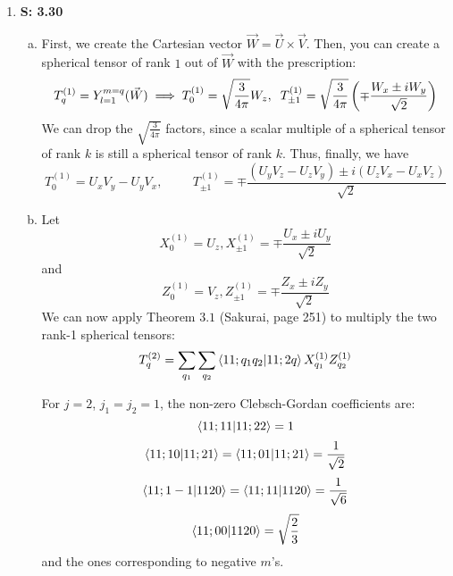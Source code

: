 \documentclass[12pt, letterpaper]{article}
\begin{document}
\begin{enumerate}

    \item[] \textbf{S: 3.30}
    \begin{enumerate}[(a)]
\item First, we create the Cartesian vector $\vec{W}=\vec{U}\times \vec{V}$. Then, you can create a spherical tensor of rank $1$ out of $\vec{W}$ with the prescription:
\begin{equation}
        T^{(1)}_q=Y_{l=1}^{m=q}(\vec{W})\implies T^{(1)}_0=\sqrt{\frac{3}{4\pi}}W_z,\hspace{2mm} T^{(1)}_{\pm 1}=\sqrt{\frac{3}{4\pi}}\left(\mp \frac{W_x\pm iW_y}{\sqrt{2}}\right)
\end{equation}
We can drop the $\sqrt{\frac{3}{4\pi}}$ factors, since a scalar multiple of a spherical tensor of rank $k$ is still a spherical tensor of rank $k$. Thus, finally, we have
\begin{equation}
        T^{(1)}_0=U_xV_y-U_yV_x,\hspace{1cm}T_{\pm 1}^{(1)}=\mp \frac{\left(U_yV_z-U_zV_y\right)\pm i\left(U_zV_x-U_xV_z\right)}{\sqrt{2}}
\end{equation}
\item 
Let 
\begin{equation}
        X^{(1)}_0=U_z,X^{(1)}_{\pm 1}=\mp \frac{U_x\pm iU_y}{\sqrt{2}}
\end{equation}
and 
\begin{equation}
        Z^{(1)}_0=V_z,Z^{(1)}_{\pm 1}=\mp \frac{Z_x\pm iZ_y}{\sqrt{2}}
\end{equation}
We can now apply Theorem $3.1$ (Sakurai, page 251) to multiply the two rank-1 spherical tensors:
\begin{align}
    T^{(2)}_q=\sum_{q_1}\sum_{q_2}\braket{1 1;q_1 q_2|1 1; 2 q}X_{q_1}^{(1)}Z_{q_2}^{(1)}
\end{align}

For $j=2$, $j_1=j_2=1$, the non-zero Clebsch-Gordan coefficients are:
\begin{equation}
        \braket{1 1; 1 1|1 1; 2 2}=1
\end{equation}
\begin{equation}
        \braket{1 1; 1 0| 1 1; 2 1}=\braket{1 1; 0 1| 1 1; 2 1}=\frac{1}{\sqrt{2}}
\end{equation}
\begin{equation}
        \braket{1 1; 1 -1| 1 1 2 0}=\braket{1 1; 1 1| 1 1 2 0}=\frac{1}{\sqrt{6}}
\end{equation}
\begin{equation}
        \braket{1 1; 0 0| 1 1 2 0}=\sqrt{\frac{2}{3}}
\end{equation}
and the ones corresponding to negative $m$'s. 


\end{enumerate}
\end{enumerate}
\end{document}
